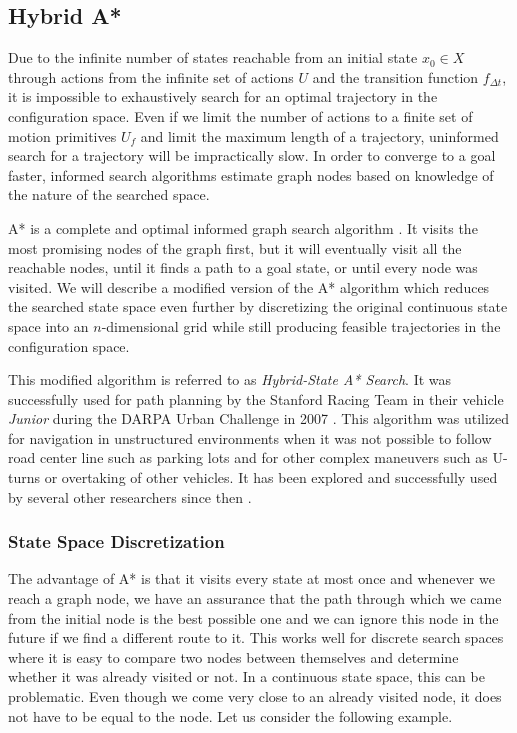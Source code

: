 \subsection{Hybrid A*}
\label{sec:hybrid-astar}

Due to the infinite number of states reachable from an initial state $x_0\in X$ through actions from the infinite set of actions $U$ and the transition function $f_{\Delta t}$, it is impossible to exhaustively search for an optimal trajectory in the configuration space. Even if we limit the number of actions to a finite set of motion primitives $U_f$ and limit the maximum length of a trajectory, uninformed search for a trajectory will be impractically slow. In order to converge to a goal faster, informed search algorithms estimate graph nodes based on knowledge of the nature of the searched space.

A* is a complete and optimal informed graph search algorithm \cite{Nilsson_astar}. It visits the most promising nodes of the graph first, but it will eventually visit all the reachable nodes, until it finds a path to a goal state, or until every node was visited. We will describe a modified version of the A* algorithm which reduces the searched state space even further by discretizing the original continuous state space into an $n$-dimensional grid while still producing feasible trajectories in the configuration space.

This modified algorithm is referred to as \textit{Hybrid-State A* Search}. It was successfully used for path planning by the Stanford Racing Team in their vehicle \textit{Junior} during the DARPA Urban Challenge in 2007 \cite{dolgov08gppSTAIR}. This algorithm was utilized for navigation in unstructured environments when it was not possible to follow road center line such as parking lots and for other complex maneuvers such as U-turns or overtaking of other vehicles. It has been explored and successfully used by several other researchers since then \cite{Hybrid_astar}.

\subsubsection{State Space Discretization}

The advantage of A* is that it visits every state at most once and whenever we reach a graph node, we have an assurance that the path through which we came from the initial node is the best possible one and we can ignore this node in the future if we find a different route to it. This works well for discrete search spaces where it is easy to compare two nodes between themselves and determine whether it was already visited or not. In a continuous state space, this can be problematic. Even though we come very close to an already visited node, it does not have to be equal to the node. Let us consider the following example.

